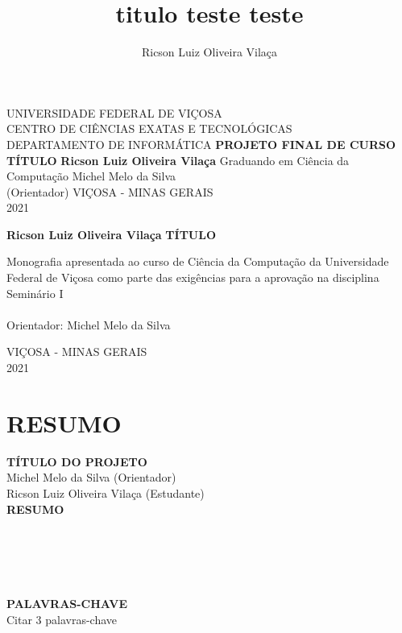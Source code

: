 \documentclass[12pt,a4paper]{article}
\author{Ricson Luiz Oliveira Vilaça}
\title{titulo teste teste}
\begin{document}
	
	\centering
	
		\thispagestyle{empty}
		UNIVERSIDADE FEDERAL DE VIÇOSA\\
		CENTRO DE CIÊNCIAS EXATAS E TECNOLÓGICAS\\
		DEPARTAMENTO DE INFORMÁTICA
		\vfill
		{\large \textbf{PROJETO FINAL DE CURSO}}
		\vfill
		{\Large \textbf{TÍTULO}}
		\vfill
		\textbf{Ricson Luiz Oliveira Vilaça} \hfill Graduando em Ciência da Computação
		\vfill
		Michel Melo da Silva\\
		(Orientador)
		\vfill
		VIÇOSA - MINAS GERAIS\\
		2021
	
	\newpage
		\thispagestyle{empty}
		\textbf{Ricson Luiz Oliveira Vilaça}
		\vfill
		{\Large \textbf{TÍTULO}}
		\vfill
		\begin{flushright}
			\begin{minipage}{.5\textwidth}
				Monografia apresentada ao curso de Ciência da Computação da Universidade Federal de Viçosa como parte das exigências para a aprovação na disciplina Seminário I\\\\
				Orientador: Michel Melo da Silva
			\end{minipage}
		\end{flushright}
		\vfill
		VIÇOSA - MINAS GERAIS\\
		2021
	
	\justifying
	
	\newpage
		\tableofcontents
		\thispagestyle{empty}
	
	\newpage
		\centering\section*{RESUMO}\justifying
		
		\noindent\textbf{TÍTULO DO PROJETO}\\
		
		\indent Michel Melo da Silva (Orientador)\\
		\indent Ricson Luiz Oliveira Vilaça (Estudante)\\
		
		\noindent \textbf{RESUMO}\\
		\\\\\\\\\\
		
		\noindent \textbf{PALAVRAS-CHAVE}\\
		\indent Citar 3 palavras-chave\\
		
\end{document}
